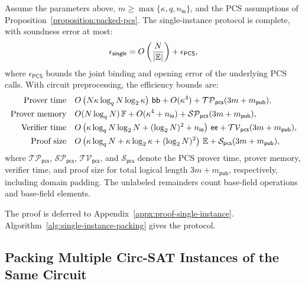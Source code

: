 \begin{theorem}
\label{theorem:single-instance-packing}
Assume the parameters above, \(m\geq\max\{\kappa,q,n_{\mathsf{io}}\}\),
and the PCS assumptions of Proposition~\ref{proposition:packed-pcs}.
The single-instance protocol is complete, with soundness error
at most:
\begin{equation}
    \epsilon_\mathsf{single}
       =O\left(\frac{N}{|\mathbb{E}|}\right) + \epsilon_{\mathsf{PCS}},
\label{eq:together-soundness}
\end{equation}
where \(\epsilon_{\mathsf{PCS}}\) bounds the joint binding and
opening error of the underlying PCS calls.
With circuit preprocessing, the efficiency bounds are:
\begin{equation}
\begin{aligned}
    \text{Prover time}\quad
       &O\left(N\kappa\log_q N\log_2\kappa\right)\,\mathsf{bb}
          +O(\kappa^4)
          +\mathcal{TP}_{\mathsf{pcs}}(3m+m_{\mathsf{pub}}),\\
    \text{Prover memory}\quad
       &O(N\log_q N)\,{\mathbb{F}}+O(\kappa^4+n_{\mathsf{io}})
          +\mathcal{SP}_{\mathsf{pcs}}(3m+m_{\mathsf{pub}}),\\
    \text{Verifier time}\quad
       &O\left(
          \kappa\log_q N\log_2N+(\log_2N)^2
          +n_{\mathsf{io}}
          \right)\,\mathsf{ee}
          +\mathcal{TV}_{\mathsf{pcs}}(3m+m_{\mathsf{pub}}),\\
    \text{Proof size}\quad
       &O\left(\kappa\log_q N
          +\kappa\log_2\kappa
          +(\log_2N)^2\right)\,\mathbb{E}
          +\mathcal{S}_{\mathsf{pcs}}(3m+m_{\mathsf{pub}}),
\end{aligned}
\label{eq:together-single-efficiency}
\end{equation}
where \(\mathcal{TP}_{\mathsf{pcs}}\),
\(\mathcal{SP}_{\mathsf{pcs}}\),
\(\mathcal{TV}_{\mathsf{pcs}}\), and
\(\mathcal{S}_{\mathsf{pcs}}\) denote the PCS
prover time, prover memory, verifier time, and proof size for
total logical length \(3m+m_\mathsf{pub}\), respectively,
including domain padding. The unlabeled remainders count
base-field operations and base-field elements.
\end{theorem}

The proof is deferred to Appendix~\ref{appx:proof-single-instance}.
Algorithm~\ref{alg:single-instance-packing} gives the protocol.

\subsection{Packing Multiple Circ-SAT Instances of the Same Circuit}
\label{sec:multi-instance-packing}

